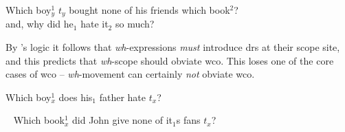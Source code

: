 \documentclass[nols,twoside,nofonts,nobib,nohyper]{tufte-handout}
\begin{document}
\ex
Which boy$^{1}_{y}$ $t_{y}$ bought none of his friends which book$^{2}$?\\
and, why did he$_{1}$ hate it$_{2}$ so much?
\xe

By \citeauthor{chierchia2020}'s logic it follows that \textit{wh}-expressions
\textit{must} introduce \acp{dr} at their scope site, and this predicts that
\textit{wh}-scope should obviate \ac{wco}. This loses one of the core cases of
\ac{wco} -- \textit{wh}-movement can certainly \textit{not} obviate \ac{wco}.

\ex
\ljudge{*}Which boy$^{1}_{x}$ does his$_{1}$ father hate $t_{x}$?
\xe

\ex~
\ljudge{*}Which book$^{1}_{x}$ did John give none of it$_{1}$s fans $t_{x}$?
\xe












\end{document}
